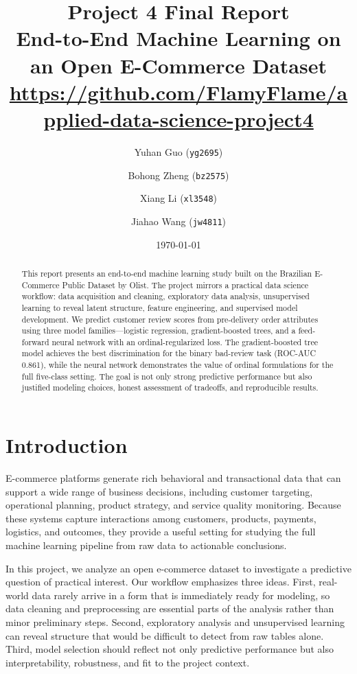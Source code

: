 \documentclass[11pt]{article}
\title{Project 4 Final Report\\End-to-End Machine Learning on an Open E-Commerce Dataset\\[0.5em]
\small\url{https://github.com/FlamyFlame/applied-data-science-project4}}
\author{
    Yuhan Guo (\texttt{yg2695}) \and
    Bohong Zheng (\texttt{bz2575}) \and
    Xiang Li (\texttt{xl3548}) \and
    Jiahao Wang (\texttt{jw4811})
}
\date{\today}
\begin{document}
\maketitle
\onehalfspacing

\begin{abstract}
This report presents an end-to-end machine learning study built on the Brazilian E-Commerce Public Dataset by Olist. The project mirrors a practical data science workflow: data acquisition and cleaning, exploratory data analysis, unsupervised learning to reveal latent structure, feature engineering, and supervised model development. We predict customer review scores from pre-delivery order attributes using three model families---logistic regression, gradient-boosted trees, and a feed-forward neural network with an ordinal-regularized loss. The gradient-boosted tree model achieves the best discrimination for the binary bad-review task (ROC-AUC 0.861), while the neural network demonstrates the value of ordinal formulations for the full five-class setting. The goal is not only strong predictive performance but also justified modeling choices, honest assessment of tradeoffs, and reproducible results.
\end{abstract}

\tableofcontents
\newpage

\section{Introduction}

E-commerce platforms generate rich behavioral and transactional data that can support a wide range of business decisions, including customer targeting, operational planning, product strategy, and service quality monitoring. Because these systems capture interactions among customers, products, payments, logistics, and outcomes, they provide a useful setting for studying the full machine learning pipeline from raw data to actionable conclusions.

In this project, we analyze an open e-commerce dataset to investigate a predictive question of practical interest. Our workflow emphasizes three ideas. First, real-world data rarely arrive in a form that is immediately ready for modeling, so data cleaning and preprocessing are essential parts of the analysis rather than minor preliminary steps. Second, exploratory analysis and unsupervised learning can reveal structure that would be difficult to detect from raw tables alone. Third, model selection should reflect not only predictive performance but also interpretability, robustness, and fit to the project context.
\end{document}
